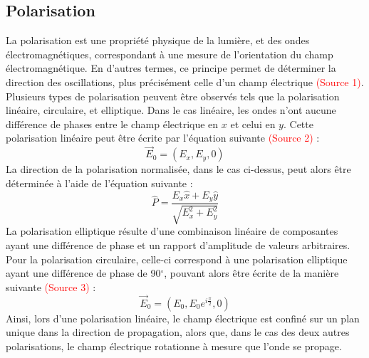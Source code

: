 \documentclass[11pt,letterpaper]{article}
\begin{document}
\subsection{Polarisation}
La polarisation est une propriété physique de la lumière, et des ondes électromagnétiques, correspondant à une mesure de l'orientation du champ électromagnétique. En d'autres termes, ce principe permet de déterminer la direction des oscillations, plus précisément celle d'un champ électrique \textcolor{red}{(Source 1)}. Plusieurs types de polarisation peuvent être observés tels que la polarisation linéaire, circulaire, et elliptique. Dans le cas linéaire, les ondes n'ont aucune différence de phases entre le champ électrique en $x$ et celui en $y$. Cette polarisation linéaire peut être écrite par l'équation suivante \textcolor{red}{(Source 2)} :
\begin{equation}
  \vec{E}_{0}=(E_{x},E_{y},0)
  \label{pol_lin}
\end{equation}
La direction de la polarisation normalisée, dans le cas ci-dessus, peut alors être déterminée à l'aide de l'équation suivante :
\begin{equation}
  \hat{P}=\frac{E_{x}\hat{x}+E_{y}\hat{y}}{\sqrt{E_{x}^{2}+E_{y}^{2}}}
\end{equation}
La polarisation elliptique résulte d'une combinaison linéaire de composantes ayant une différence de phase et un rapport d'amplitude de valeurs arbitraires. Pour la polarisation circulaire, celle-ci correspond à une polarisation elliptique ayant une différence de phase de 90$^\circ$, pouvant alors être écrite de la manière suivante \textcolor{red}{(Source 3)} :
\begin{equation}
  \vec{E}_{0}=(E_{0},E_{0}e^{i\frac{\pi}{2}},0)
\end{equation}
Ainsi, lors d'une polarisation linéaire, le champ électrique est confiné sur un plan unique dans la direction de propagation, alors que, dans le cas des deux autres polarisations, le champ électrique rotationne à mesure que l'onde se propage.

\end{document}
